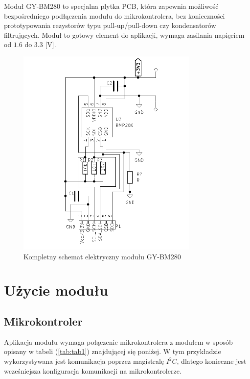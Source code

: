 \documentclass[11pt, a4paper]{article}
\begin{document}
\vspace{0.5cm}
Moduł GY-BM280 to specjalna plytka PCB, która zapewnia możliwość bezpośredniego podłączenia modułu do mikrokontrolera, bez konieczności prototypowania rezystorów typu pull-up/pull-down czy kondensatorów filtrujących. Moduł to gotowy element do aplikacji, wymaga zasilania napięciem od $1.6$ do $3.3$ [V].
\newpage
\begin{figure}[h]
    \centering
    \includegraphics[width=0.8\textwidth]{fig/GY-BM280/modul_schemat_elektryczny.PNG}
    \caption{Kompletny schemat elektryczny modułu GY-BM280}
    \label{fig:polaczenie_ukladu}
\end{figure}
\newpage
\section{Użycie modułu}
\subsection{Mikrokontroler}
Aplikacja modułu wymaga połączenie mikrokontrolera z modułem w sposób opisany w tabeli (\ref{tab:tab1}) znajdującej się poniżej.
W tym przykładzie wykorzystywana jest komunikacja poprzez magistralę $I^2C$, dlatego konieczne jest wcześniejsza konfiguracja komunikacji na mikrokontrolerze. 
\end{document}
